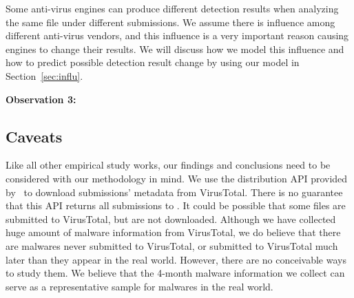 Some anti-virus engines can produce different detection results when analyzing the same file under different submissions.
We assume there is influence among different anti-virus vendors, 
and this influence is a very important reason causing engines to change their results.
We will discuss how we model this influence and how to predict possible detection result change by using our model in Section~\ref{sec:influ}.
\fi

{\bf Observation 3:} 
{\em }

\subsection{Caveats}
Like all other empirical study works, 
our findings and conclusions need to be considered with our methodology in mind. 
We use the distribution API provided by \vt\ to download submissions' metadata 
from VirusTotal. 
There is no guarantee that this API returns all submissions to \vt.
It could be possible that some files are submitted to VirusTotal, 
but are not downloaded. %
Although we have collected huge amount of malware information from VirusTotal,
we do believe that there are malwares never submitted to VirusTotal, 
or submitted to VirusTotal much later than they appear in the real world. 
However, there are no conceivable ways to study them.
We believe that the 4-month malware information we collect can serve as a representative sample for malwares in the real world. 

